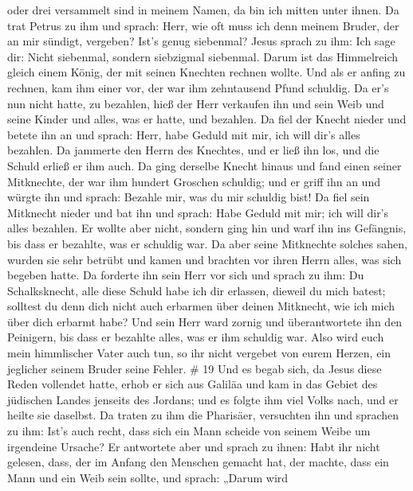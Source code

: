 oder drei versammelt sind in meinem Namen, da bin ich mitten unter
ihnen.  Da trat Petrus zu ihm und sprach: Herr, wie oft
muss ich denn meinem Bruder, der an mir sündigt, vergeben? Ist's genug
siebenmal?  Jesus sprach zu ihm: Ich sage dir: Nicht
siebenmal, sondern siebzigmal siebenmal.  Darum ist das
Himmelreich gleich einem König, der mit seinen Knechten rechnen wollte.
 Und als er anfing zu rechnen, kam ihm einer vor, der war
ihm zehntausend Pfund schuldig.  Da er's nun nicht hatte,
zu bezahlen, hieß der Herr verkaufen ihn und sein Weib und seine Kinder
und alles, was er hatte, und bezahlen.  Da fiel der Knecht
nieder und betete ihn an und sprach: Herr, habe Geduld mit mir, ich will
dir's alles bezahlen.  Da jammerte den Herrn des Knechtes,
und er ließ ihn los, und die Schuld erließ er ihm auch.  Da
ging derselbe Knecht hinaus und fand einen seiner Mitknechte, der war
ihm hundert Groschen schuldig; und er griff ihn an und würgte ihn und
sprach: Bezahle mir, was du mir schuldig bist!  Da fiel
sein Mitknecht nieder und bat ihn und sprach: Habe Geduld mit mir; ich
will dir's alles bezahlen.  Er wollte aber nicht, sondern
ging hin und warf ihn ins Gefängnis, bis dass er bezahlte, was er
schuldig war.  Da aber seine Mitknechte solches sahen,
wurden sie sehr betrübt und kamen und brachten vor ihren Herrn alles,
was sich begeben hatte.  Da forderte ihn sein Herr vor sich
und sprach zu ihm: Du Schalksknecht, alle diese Schuld habe ich dir
erlassen, dieweil du mich batest;  solltest du denn dich
nicht auch erbarmen über deinen Mitknecht, wie ich mich über dich
erbarmt habe?  Und sein Herr ward zornig und überantwortete
ihn den Peinigern, bis dass er bezahlte alles, was er ihm schuldig war.
 Also wird euch mein himmlischer Vater auch tun, so ihr
nicht vergebet von eurem Herzen, ein jeglicher seinem Bruder seine
Fehler. \# 19  Und es begab sich, da Jesus diese Reden
vollendet hatte, erhob er sich aus Galiläa und kam in das Gebiet des
jüdischen Landes jenseits des Jordans;  und es folgte ihm
viel Volks nach, und er heilte sie daselbst.  Da traten zu
ihm die Pharisäer, versuchten ihn und sprachen zu ihm: Ist's auch recht,
dass sich ein Mann scheide von seinem Weibe um irgendeine Ursache?
 Er antwortete aber und sprach zu ihnen: Habt ihr nicht
gelesen, dass, der im Anfang den Menschen gemacht hat, der machte, dass
ein Mann und ein Weib sein sollte,  und sprach: „Darum wird
